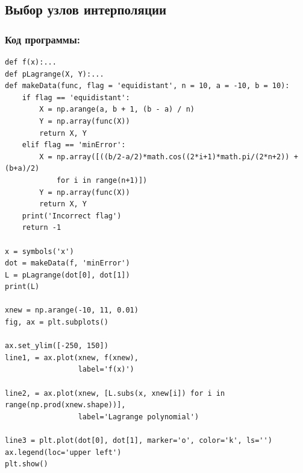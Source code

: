 \documentclass[12pt,a4paper]{article}
\begin{document}
\subsection{Выбор узлов интерполяции}

\subsubsection{Код программы:}
\begin{verbatim}
def f(x):...
def pLagrange(X, Y):...
def makeData(func, flag = 'equidistant', n = 10, a = -10, b = 10):
    if flag == 'equidistant':
        X = np.arange(a, b + 1, (b - a) / n)
        Y = np.array(func(X))
        return X, Y
    elif flag == 'minError':
        X = np.array([((b/2-a/2)*math.cos((2*i+1)*math.pi/(2*n+2)) + (b+a)/2) 
            for i in range(n+1)])
        Y = np.array(func(X))
        return X, Y
    print('Incorrect flag')
    return -1

x = symbols('x')
dot = makeData(f, 'minError')
L = pLagrange(dot[0], dot[1])
print(L)

xnew = np.arange(-10, 11, 0.01)
fig, ax = plt.subplots()

ax.set_ylim([-250, 150])
line1, = ax.plot(xnew, f(xnew),
                 label='f(x)')

line2, = ax.plot(xnew, [L.subs(x, xnew[i]) for i in range(np.prod(xnew.shape))],
                 label='Lagrange polynomial')

line3 = plt.plot(dot[0], dot[1], marker='o', color='k', ls='')
ax.legend(loc='upper left')
plt.show()
\end{verbatim}
\end{document}
